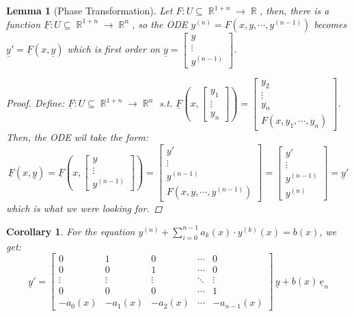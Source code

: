 \documentclass[12pt]{article}
\DeclareMathOperator{\R}{\mathbb{R}}
\newcommand{\der}[2][n]{{#2}^{(#1)}}
\newcommand{\tuple}[1]{\underline{#1}}
\newtheorem{lemma}[theorem]{Lemma}
\newtheorem{corollary}[theorem]{Corollary}
\begin{document}
\begin{lemma}[Phase Transformation]
  \label{phase_transform}
  Let $F:U\subseteq \R^{1+n}\to\R$, then, there is a function $\tuple{F}:U\subseteq \R^{1+n}\to\R^n$, so the ODE $\der{y}=F(x,y,\cdots,\der[n-1]{y})$ becomes $\tuple{y}'=\tuple{F}(x,\tuple{y})$ which is first order on $\tuple{y}=\begin{bmatrix}y\\\vdots\\\der[n-1]{y}\end{bmatrix}$.
  \begin{proof}
    Define: $\tuple{F}:U\subseteq \R^{1+n}\to\R^n$ s.t. $\tuple{F}\left(x,\begin{bmatrix}y_1\\\vdots\\y_n\end{bmatrix}\right)=\begin{bmatrix}y_2\\\vdots\\y_n\\F(x,y_1,\cdots,y_n)\end{bmatrix}$. Then, the ODE wil take the form: $$\tuple{F}(x,\tuple{y})=\tuple{F}\left(x,\begin{bmatrix}y\\\vdots\\\der[n-1]{y}\end{bmatrix}\right)=\begin{bmatrix}y'\\\vdots\\\der[n-1]{y}\\F(x,y,\cdots,\der[n-1]{y})\end{bmatrix}=\begin{bmatrix}y'\\\vdots\\\der[n-1]{y}\\\der{y}\end{bmatrix}=\tuple{y}'$$ which is what we were looking for.
  \end{proof}
\end{lemma}

\begin{corollary}
  For the equation $\der{y}+\sum_{i=0}^{n-1} a_k(x)\cdot\der[k]{y}(x)=b(x)$, we get: $$\tuple{y}'=\begin{bmatrix}
    0&1&0&\cdots&0\\
    0&0&1&\cdots&0\\
    \vdots&\vdots&\vdots&\ddots&\vdots\\
    0&0&0&\cdots&1\\
    -a_0(x)&-a_1(x)&-a_2(x)&\cdots&-a_{n-1}(x)
  \end{bmatrix}\,\tuple{y}+b(x)\,\tuple{e}_n$$
\end{corollary}
\end{document}
